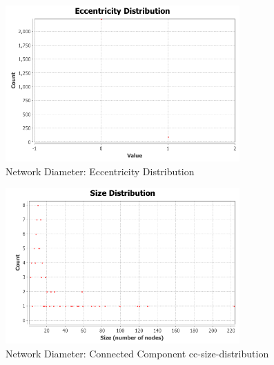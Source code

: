 \documentclass[letterpaper,11pt]{article}
\begin{document}
\begin{figure}[!ht]
\centering
\includegraphics[width=0.8\textwidth]{Q3/NetworkDiameter/Eccentricity Distribution.png}
\caption{Network Diameter: Eccentricity Distribution}
\label{fig:Network Diameter Eccentricity Distribution}
\end{figure}

\begin{figure}[!ht]
\centering
\includegraphics[width=0.8\textwidth]{Q3/NetworkDiameter/connectedcomponent/cc-size-distribution.png}
\caption{Network Diameter: Connected Component cc-size-distribution}
\label{fig:Network Diameter Connected Component cc-size-distribution}
\end{figure}
\end{document}
